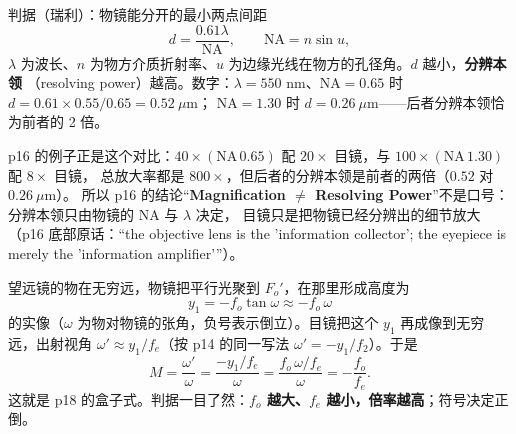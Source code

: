 ﻿\documentclass[11pt]{ctexart}
\begin{document}

判据（瑞利）：物镜能分开的最小两点间距
\[
d=\frac{0.61\lambda}{\mathrm{NA}},\qquad \mathrm{NA}=n\sin u ,
\]
$\lambda$ 为波长、$n$ 为物方介质折射率、$u$ 为边缘光线在物方的孔径角。$d$ 越小，\textbf{分辨本领}
（resolving power）越高。数字：$\lambda=550$ nm、$\mathrm{NA}=0.65$ 时 $d=0.61\times0.55/0.65=0.52\ \mu\mathrm{m}$；
$\mathrm{NA}=1.30$ 时 $d=0.26\ \mu\mathrm{m}$——后者分辨本领恰为前者的 2 倍。

p16 的例子正是这个对比：$40\times(\mathrm{NA}\,0.65)$ 配 $20\times$ 目镜，与 $100\times(\mathrm{NA}\,1.30)$ 配 $8\times$ 目镜，
总放大率都是 $800\times$，但后者的分辨本领是前者的两倍（$0.52$ 对 $0.26\ \mu\mathrm{m}$）。
所以 p16 的结论“\textbf{Magnification $\ne$ Resolving Power}”不是口号：分辨本领只由物镜的 NA 与 $\lambda$ 决定，
目镜只是把物镜已经分辨出的细节放大（p16 底部原话：“the objective lens is the 'information collector';
the eyepiece is merely the 'information amplifier'”）。



望远镜的物在无穷远，物镜把平行光聚到 $F_o'$，在那里形成高度为
\[
y_1=-f_o\tan\omega\approx-f_o\,\omega
\]
的实像（$\omega$ 为物对物镜的张角，负号表示倒立）。目镜把这个 $y_1$ 再成像到无穷远，出射视角
$\omega'\approx y_1/f_e$（按 p14 的同一写法 $\omega'=-y_1/f_2$）。于是
\[
M=\frac{\omega'}{\omega}=\frac{-y_1/f_e}{\omega}=\frac{f_o\,\omega/f_e}{\omega}
=-\frac{f_o}{f_e}.
\]
这就是 p18 的盒子式。判据一目了然：\textbf{$f_o$ 越大、$f_e$ 越小，倍率越高}；符号决定正倒。


\end{document}
